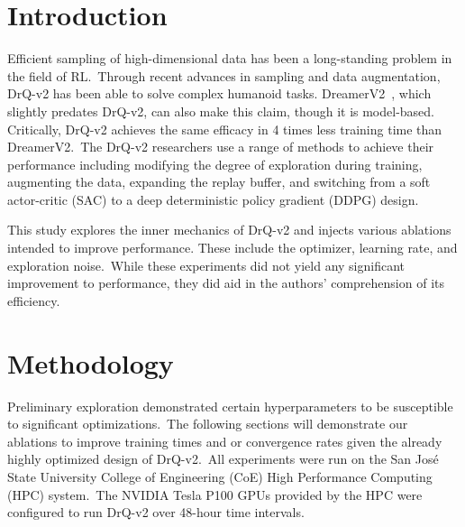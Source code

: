 \documentclass[conference]{./IEEEtran/IEEEtran} %
\begin{document}
    \section{Introduction}\label{sec:introduction}
    Efficient sampling of high-dimensional data has been a long-standing problem in the field of RL.\ Through recent
    advances in sampling and data augmentation, DrQ-v2 has been able to solve complex humanoid tasks.
    DreamerV2~\cite{DreamerV2}, which slightly predates DrQ-v2, can also make this claim, though it is model-based.
    Critically, DrQ-v2 achieves the same efficacy in 4 times less training time than DreamerV2.\ The DrQ-v2 researchers
    use a range of methods to achieve their performance including modifying the degree of exploration during training,
    augmenting the data, expanding the replay buffer, and switching from a soft actor-critic (SAC) to a deep
    deterministic policy gradient (DDPG) design.


    This study explores the inner mechanics of DrQ-v2 and injects various ablations intended to improve performance.
    These include the optimizer, learning rate, and exploration noise.\ While these experiments did not yield any
    significant improvement to performance, they did aid in the authors' comprehension of its efficiency.

    \section{Methodology}\label{sec:methodology}

    Preliminary exploration demonstrated certain hyperparameters to be susceptible to significant optimizations.\ The following
    sections will demonstrate our ablations to improve training times and or convergence rates given the already highly optimized
    design of DrQ-v2.\ All experiments were run on the San Jos\'e State University College of Engineering (CoE) High Performance
    Computing (HPC) system.\ The NVIDIA Tesla P100 GPUs provided by the HPC were configured to run DrQ-v2 over 48-hour time intervals.
\end{document}
